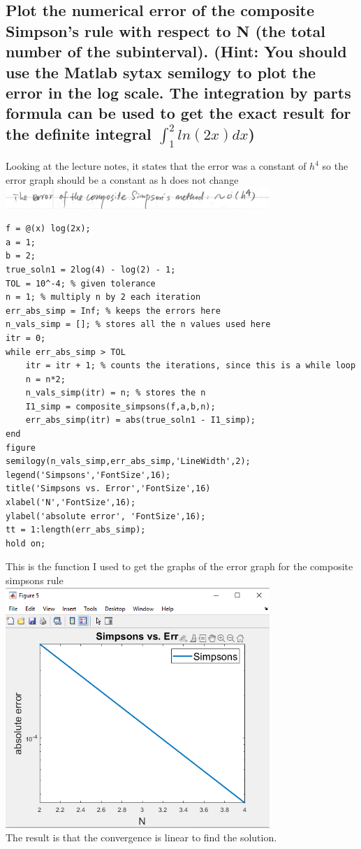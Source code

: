 \documentclass[12pt,letterpaper]{article}
\begin{document}
\subsection{Plot the numerical error of the composite Simpson’s rule with respect to N (the total
number of the subinterval). (Hint: You should use the Matlab sytax semilogy to plot
the error in the log scale. The integration by parts formula can be used to get the exact
result for the definite integral \boldmath$\int_{1}^{2}ln(2x)dx$)}
Looking at the lecture notes, it states that the error was a constant of $h^{4}$ so the error graph should be a constant as h does not change\\
\includegraphics[width=100mm]{cs_err}
\begin{lstlisting}
f = @(x) log(2x);
a = 1;
b = 2;
true_soln1 = 2log(4) - log(2) - 1;
TOL = 10^-4; % given tolerance
n = 1; % multiply n by 2 each iteration
err_abs_simp = Inf; % keeps the errors here
n_vals_simp = []; % stores all the n values used here
itr = 0;
while err_abs_simp > TOL
    itr = itr + 1; % counts the iterations, since this is a while loop
    n = n*2;
    n_vals_simp(itr) = n; % stores the n
    I1_simp = composite_simpsons(f,a,b,n);
    err_abs_simp(itr) = abs(true_soln1 - I1_simp);
end
figure
semilogy(n_vals_simp,err_abs_simp,'LineWidth',2); 
legend('Simpsons','FontSize',16);
title('Simpsons vs. Error','FontSize',16)
xlabel('N','FontSize',16);
ylabel('absolute error', 'FontSize',16);
tt = 1:length(err_abs_simp);
hold on;
\end{lstlisting}
This is the function I used to get the graphs of the error graph for the composite simpsons rule\\
\includegraphics[width=100mm]{cs_sem}\\
The result is that the convergence is linear to find the solution.
\end{document}
